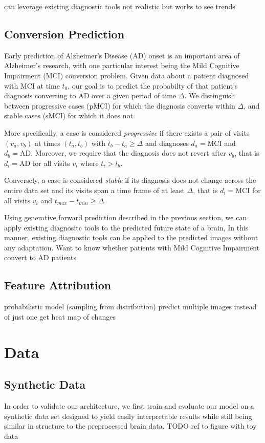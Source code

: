 can leverage existing diagnostic tools
not realistic but works to see trends

\section{Conversion Prediction} \label{sec:appconvpred}
Early prediction of Alzheimer's Disease (AD) onset is an important area of Alzheimer's research, with one particular interest being the Mild Cognitive Impairment (MCI) conversion problem. Given data about a patient diagnosed with MCI at time $t_0$, our goal is to predict the probabilty of that patient's diagnosis converting to AD over a given period of time $ \Delta $. 
We distinguish between progressive cases (pMCI) for which the diagnosis converts within $\Delta$, and stable cases (sMCI) for which it does not.

More specifically, a case is considered \textit{progressive} if there exists a pair of visits $(v_a, v_b)$ at times $(t_a, t_b)$ with $ t_b - t_a \geq \Delta $ and diagnoses $d_a = \text{MCI} $ and $d_b = \text{AD} $. Moreover, we require that the diagnosis does not revert after $v_b$, that is $ d_i = \text{AD} $ for all visits $v_i$ where $t_i > t_b$.

Conversely, a case is considered \textit{stable} if its diagnosis does not change across the entire data set and its visits span a time frame of at least $\Delta$, that is $ d_i = \text{MCI} $ for all visits $v_i$ and $ { t_{max} - t_{min} \geq \Delta } $.

Using generative forward prediction described in the previous section, we can apply existing diagnositc tools to the predicted future state of a brain,
In this manner, existing diagnostic tools can be applied to the predicted images without any adaptation.
Want to know whether patients with Mild Cognitive Impairment convert to AD patients

\section{Feature Attribution}
probabilistic model (sampling from distribution)
predict multiple images instead of just one
get heat map of changes

\chapter{Data}

\section{Synthetic Data}
In order to validate our architecture, we first train and evaluate our model on a synthetic data set designed to yield easily interpretable results while still being similar in structure to the preprocessed brain data. TODO ref to figure with toy data

